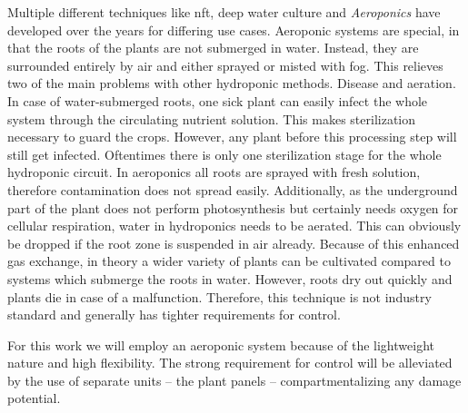 Multiple different techniques like \ac{nft}, deep water culture and \textit{Aeroponics} have developed over the years for differing use cases.
Aeroponic systems are special, in that the roots of the plants are not submerged in water.
Instead, they are surrounded entirely by air and either sprayed or misted with fog.
This relieves two of the main problems with other hydroponic methods.
Disease and aeration.
In case of water-submerged roots, one sick plant can easily infect the whole system through the circulating nutrient solution.
This makes sterilization necessary to guard the crops.
However, any plant before this processing step will still get infected.
Oftentimes there is only one sterilization stage for the whole hydroponic circuit.
In aeroponics all roots are sprayed with fresh solution, therefore contamination does not spread easily.
Additionally, as the underground part of the plant does not perform photosynthesis but certainly needs oxygen for cellular respiration, water in hydroponics needs to be aerated.
This can obviously be dropped if the root zone is suspended in air already.
Because of this enhanced gas exchange, in theory a wider variety of plants can be cultivated compared to systems which submerge the roots in water.
However, roots dry out quickly and plants die in case of a malfunction.
Therefore, this technique is not industry standard and generally has tighter requirements for control.

For this work we will employ an aeroponic system because of the lightweight nature and high flexibility.
The strong requirement for control will be alleviated by the use of separate units -- the plant panels -- compartmentalizing any damage potential.




